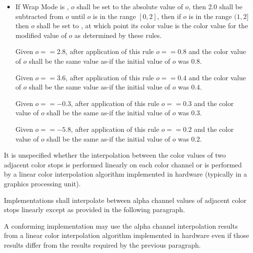 \begin{enumeratea}
\begin{itemize}
	\item If Wrap Mode is , $o$ shall be set to the absolute value of $o$, then 2.0 shall be subtracted from $o$ until $o$ is in the range $[0,2]$, then if $o$ is in the range $(1,2]$ then $o$ shall be set to , at which point its color value is the color value for the modified value of $o$ as determined by these rules.
	\begin{example}
	Given $o == 2.8$, after application of this rule $o == 0.8$ and the color value of $o$ shall be the same value as-if the initial value of $o$ was $0.8$.
	
	Given $o == 3.6$, after application of this rule $o == 0.4$ and the color value of $o$ shall be the same value as-if the initial value of $o$ was $0.4$.
	
	Given $o == -0.3$, after application of this rule $o == 0.3$ and the color value of $o$ shall be the same as-if the initial value of $o$ was $0.3$.
	
	Given $o == -5.8$, after application of this rule $o == 0.2$ and the color value of $o$ shall be the same as-if the initial value of $o$ was $0.2$.
	\end{example}
	\end{itemize}
\end{enumeratea}

\pnum
It is unspecified whether the interpolation between the color values of two adjacent color stops is performed linearly on each color channel or is performed by a linear color interpolation algorithm implemented in hardware (typically in a graphics processing unit).

\pnum
Implementations shall interpolate between alpha channel values of adjacent color stops linearly except as provided in the following paragraph.

\pnum
A conforming implementation may use the alpha channel interpolation results from a linear color interpolation algorithm implemented in hardware even if those results differ from the results required by the previous paragraph.
